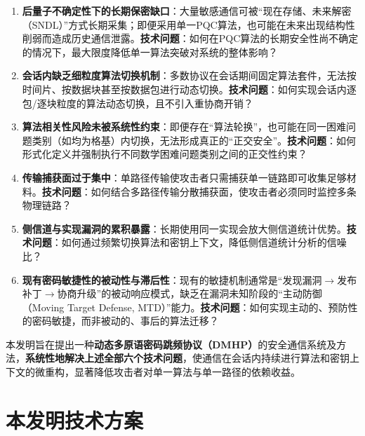 \documentclass[12pt,a4paper]{article}
\begin{document}
\begin{enumerate}[label=(\arabic*)]
    \item \textbf{后量子不确定性下的长期保密缺口}：大量敏感通信可被``现在存储、未来解密（SNDL）''方式长期采集；即便采用单一PQC算法，也可能在未来出现结构性削弱而造成历史通信泄露。\textbf{技术问题}：如何在PQC算法的长期安全性尚不确定的情况下，最大限度降低单一算法突破对系统的整体影响？

    \item \textbf{会话内缺乏细粒度算法切换机制}：多数协议在会话期间固定算法套件，无法按时间片、按数据块甚至按数据包进行动态切换。\textbf{技术问题}：如何实现会话内逐包/逐块粒度的算法动态切换，且不引入重协商开销？

    \item \textbf{算法相关性风险未被系统性约束}：即便存在``算法轮换''，也可能在同一困难问题类别（如均为格基）内切换，无法形成真正的``正交安全''。\textbf{技术问题}：如何形式化定义并强制执行不同数学困难问题类别之间的正交性约束？

    \item \textbf{传输捕获面过于集中}：单路径传输使攻击者只需捕获单一链路即可收集足够材料。\textbf{技术问题}：如何结合多路径传输分散捕获面，使攻击者必须同时监控多条物理链路？

    \item \textbf{侧信道与实现漏洞的累积暴露}：长期使用同一实现会放大侧信道统计优势。\textbf{技术问题}：如何通过频繁切换算法和密钥上下文，降低侧信道统计分析的信噪比？

    \item \textbf{现有密码敏捷性的被动性与滞后性}：现有的敏捷机制通常是``发现漏洞$\to$发布补丁$\to$协商升级''的被动响应模式，缺乏在漏洞未知阶段的``主动防御（Moving Target Defense, MTD）''能力。\textbf{技术问题}：如何实现主动的、预防性的密码敏捷，而非被动的、事后的算法迁移？
\end{enumerate}

本发明旨在提出一种\textbf{动态多原语密码跳频协议（DMHP）}的安全通信系统及方法，\textbf{系统性地解决上述全部六个技术问题}，使通信在会话内持续进行算法和密钥上下文的微重构，显著降低攻击者对单一算法与单一路径的依赖收益。

\section{本发明技术方案}
\end{document}
